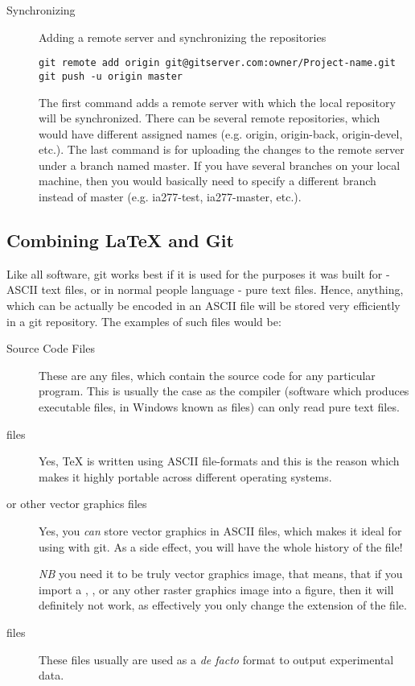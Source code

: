 \documentclass[
]{scrartcl}
\begin{document}
\begin{description}
    \item[Synchronizing] Adding a remote server and synchronizing the
        repositories
\begin{lstlisting}
git remote add origin git@gitserver.com:owner/Project-name.git
git push -u origin master
\end{lstlisting}
        The first command adds a remote server with which the local repository
            will be synchronized.
        There can be several remote repositories, which would have different
            assigned names (e.g. origin, origin-back, origin-devel, etc.).
        The last command is for uploading the changes to the remote server under
            a branch named master.
        If you have several branches on your local machine, then you would
            basically need to specify a different branch instead of master (e.g.
            ia277-test, ia277-master, etc.).

\end{description}

%
\subsection{Combining \LaTeX{} and Git}

%
Like all software, git works best if it is used for the purposes it was built
    for - ASCII text files, or in normal people language - pure text files.
%
Hence, anything, which can be actually be encoded in an ASCII file will be
    stored very efficiently in a git repository.
%
The examples of such files would be:
%
\begin{description}
    \item[Source Code Files] These are any files, which contain the source code
        for any particular program. This is usually the case as the compiler
        (software which produces executable files, in Windows known as
         files) can only read pure text files.

    \item[ files] Yes, \TeX{} is written using ASCII file-formats and
        this is the reason which makes it highly portable across different
        operating systems.

    \item[ or other vector graphics files] Yes, you \emph{can} store
        vector graphics in ASCII files, which makes it ideal for using with git.
        As a side effect, you will have the whole history of the file!

        \emph{NB} you need it to be truly vector graphics image, that means,
        that if you import a , , or any other raster
        graphics image into a  figure, then it will definitely not
        work, as effectively you only change the extension of the file.

    \item[ files] These files usually are used as a \emph{de facto}
        format to output experimental data.
\end{description}
\end{document}
